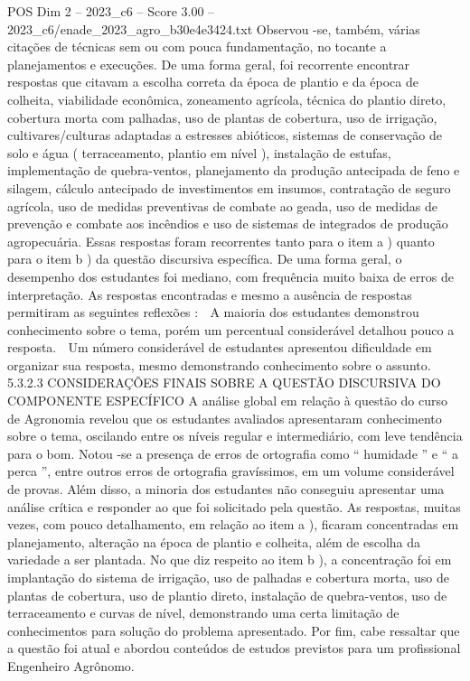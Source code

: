 \begin{textsample}{POS Dim 2 – 2023\_c6 – Score 3.00 – 2023\_c6/enade\_2023\_agro\_b30e4e3424.txt}
Observou -se, também, várias citações de técnicas sem ou com pouca fundamentação, no tocante a planejamentos e execuções.
De uma forma geral, foi recorrente encontrar respostas que citavam a escolha correta da época de plantio e da época de colheita, viabilidade econômica, zoneamento agrícola, técnica do plantio direto, cobertura morta com palhadas, uso de plantas de cobertura, uso de irrigação, cultivares/culturas adaptadas a estresses abióticos, sistemas de conservação de solo e água ( terraceamento, plantio em nível ), instalação de estufas, implementação de quebra-ventos, planejamento da produção antecipada de feno e silagem, cálculo antecipado de investimentos em insumos, contratação de seguro agrícola, uso de medidas preventivas de combate ao geada, uso de medidas de prevenção e combate aos incêndios e uso de sistemas de integrados de produção agropecuária.
Essas respostas foram recorrentes tanto para o item a ) quanto para o item b ) da questão discursiva específica.
De uma forma geral, o desempenho dos estudantes foi mediano, com frequência muito baixa de erros de interpretação.
As respostas encontradas e mesmo a ausência de respostas permitiram as seguintes reflexões :  A maioria dos estudantes demonstrou conhecimento sobre o tema, porém um percentual considerável detalhou pouco a resposta.  Um número considerável de estudantes apresentou dificuldade em organizar sua resposta, mesmo demonstrando conhecimento sobre o assunto. 5.3.2.3 CONSIDERAÇÕES FINAIS SOBRE A QUESTÃO DISCURSIVA DO COMPONENTE ESPECÍFICO A análise global em relação à questão do curso de Agronomia revelou que os estudantes avaliados apresentaram conhecimento sobre o tema, oscilando entre os níveis regular e intermediário, com leve tendência para o bom.
Notou -se a presença de erros de ortografia como “ humidade ” e “ a perca ”, entre outros erros de ortografia gravíssimos, em um volume considerável de provas.
Além disso, a minoria dos estudantes não conseguiu apresentar uma análise crítica e responder ao que foi solicitado pela questão.
As respostas, muitas vezes, com pouco detalhamento, em relação ao item a ), ficaram concentradas em planejamento, alteração na época de plantio e colheita, além de escolha da variedade a ser plantada.
No que diz respeito ao item b ), a concentração foi em implantação do sistema de irrigação, uso de palhadas e cobertura morta, uso de plantas de cobertura, uso de plantio direto, instalação de quebra-ventos, uso de terraceamento e curvas de nível, demonstrando uma certa limitação de conhecimentos para solução do problema apresentado.
Por fim, cabe ressaltar que a questão foi atual e abordou conteúdos de estudos previstos para um profissional Engenheiro Agrônomo.

\end{textsample}
